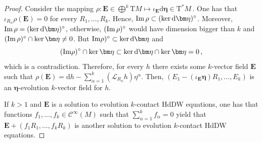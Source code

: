\documentclass[11pt,twoside]{article}
\theoremstyle{plain}
\theoremstyle{definition}
\theoremstyle{remark}
\newcommand{\dd}{\mathrm{d}}
\renewcommand{\d}{\mathrm{d}}
\newcommand{\Cinfty}{\mathscr{C}^\infty}
\newcommand{\T}{\mathrm{T}}
\newcommand{\cT}{\mathrm{T}^\ast}
\newcommand{\Lie}{\mathscr{L}}
\begin{document}
\begin{proof}
Consider the mapping
$
\textstyle\rho\colon {\bm E}\in\bigoplus^k\T M\longmapsto \iota_{\bm E}\dd\bm \eta\in \cT M\,.
$
One has that $\iota_{R_\alpha}\rho({\bm E})=0$ for every $R_1,\dotsc,R_k$. Hence, ${\rm Im}\,\rho\subset (\ker \dd \bm \eta)^\circ$. Moreover, ${\rm Im}\,\rho=(\ker \dd \bm \eta)^\circ$, otherwise, $({\rm Im}\,\rho)^\circ$ would have dimension bigger than $k$ and $({\rm Im}\,\rho)^\circ\cap \ker \bm \eta\neq 0$. But  ${\rm Im} \rho)^\circ\subset \ker\d\bm\eta$ and
$$
({\rm Im}\rho)^\circ\cap\ker \bm \eta\subset \ker\dd\bm\eta\cap\ker\bm\eta=0\,,
$$ 
which is a contradiction. Therefore, for every $h$ there exists some $k$-vector field ${\bm E}$ such that $\rho({\bm E})=\dd h-\sum_{\alpha=1}^k(\Lie_{R_\alpha}h)\eta^\alpha$. Then, $(E_1-(\iota_{\bm E}\bm \eta)R_1,\dotsc,E_k)$ is an ${\bm \eta}$-evolution $k$-vector field for $h$. 
    
If $k>1$ and ${\bm E}$ is a solution to evolution $k$-contact HdDW equations, one has that functions $f_1,\dotsc,f_k\in \Cinfty(M)$ such that $\sum_{\alpha=1}^kf_\alpha=0$ yield that ${\bm E}+(f_1R_1,\dotsc,f_kR_k)$ is another solution to evolution $k$-contact HdDW equations. 
\end{proof}


\end{document}

